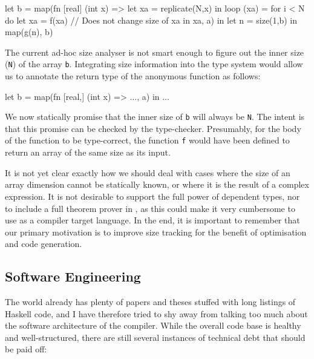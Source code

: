 \begin{colorcode}
let b = map(fn [real] (int x) =>
              let xa = replicate(N,x) in
              loop (xa) = for i < N do
                let xa = f(xa) // Does not change size of xa
                in
              xa,
            a) in
let n = size(1,b) in
map(g(n), b)
\end{colorcode}

The current ad-hoc size analyser is not smart enough to figure out the
inner size (\texttt{N}) of the array \texttt{b}.  Integrating size
information into the type system would allow us to annotate the return
type of the anonymous function as follows:

\begin{colorcode}
let b = map(fn [real,] (int x) =>
              ...,
            a) in
...
\end{colorcode}

We now statically promise that the inner size of \texttt{b} will
always be \texttt{N}.  The intent is that this promise can be checked
by the type-checker.  Presumably, for the body of the function to be
type-correct, the function \texttt{f} would have been defined to
return an array of the same size as its input.

It is not yet clear exactly how we should deal with cases where the
size of an array dimension cannot be statically known, or where it is
the result of a complex expression.  It is not desirable to support
the full power of dependent types, nor to include a full theorem
prover in \LO{}, as this could make it very cumbersome to use \LO{} as
a compiler target language.  In the end, it is important to remember
that our primary motivation is to improve size tracking for the
benefit of optimisation and code generation.


\subsection{Software Engineering}

The world already has plenty of papers and theses stuffed with long
listings of Haskell code, and I have therefore tried to shy away from
talking too much about the software architecture of the \LO{}
compiler.  While the overall code base is healthy and well-structured,
there are still several instances of technical debt that should be
paid off:

